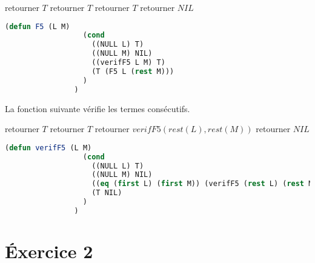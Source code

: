 \documentclass[a4paper, 12pt, leqno]{report}
\theoremstyle{plain}
\begin{document}
          \begin{algorithm}
            \caption{Algorithme pour l'inclusion de deux listes version 2}
            \begin{algorithmic}
                \State retourner $T$
                     \State retourner $T$
                    \State retourner $T$
            \Else 
                    \State retourner $NIL$        
            \EndIf        
            \end{algorithmic}
            \end{algorithm}
            
            \begin{lstlisting}[label=some-code,caption=F5 (L M) version récusive 2,language=lisp]
                (defun F5 (L M) 
	              (cond
		            ((NULL L) T)
		            ((NULL M) NIL)
		            ((verifF5 L M) T)
		            (T (F5 L (rest M)))
	              )
                )
            \end{lstlisting} 
            \newpage      
            La fonction suivante vérifie les termes consécutifs.
            
                      \begin{algorithm}
            \caption{Algorithme de vérification}
            \begin{algorithmic}
                \State retourner $T$
                     \State retourner $T$
                    \State retourner $verifF5(rest(L),rest(M))$
            \Else 
                    \State retourner $NIL$        
            \EndIf        
            \end{algorithmic}
            \end{algorithm}
            
            \begin{lstlisting}[label=some-code,caption=verifF5 (L M) version récusive 2,language=lisp]
                (defun verifF5 (L M)
	              (cond
		            ((NULL L) T)
		            ((NULL M) NIL)
		            ((eq (first L) (first M)) (verifF5 (rest L) (rest M)))
		            (T NIL)
	              )
                )
            \end{lstlisting} 
        
        \chapter{\'Exercice 2}   
            
\end{document}
